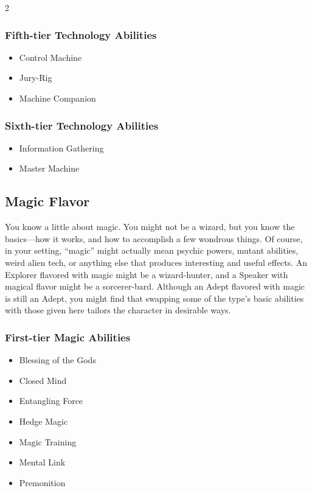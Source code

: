\begin{multicols}{2}
\subsubsection{Fifth-tier Technology Abilities}

\begin{itemize}
\item Control Machine
\item Jury-Rig
\item Machine Companion
\end{itemize}
 
\subsubsection{Sixth-tier Technology Abilities}

\begin{itemize}
\item Information Gathering
\item Master Machine
\end{itemize}

\subsection{Magic Flavor}

You know a little about magic. You might not be a wizard, but you know the basics—how it works, and how to accomplish a few wondrous things. Of course, in your setting, “magic” might actually mean psychic powers, mutant abilities, weird alien tech, or anything else that produces interesting and useful effects. 
An Explorer flavored with magic might be a wizard-hunter, and a Speaker with magical flavor might be a sorcerer-bard. Although an Adept flavored with magic is still an Adept, you might find that swapping some of the type’s basic abilities with those given here tailors the character in desirable ways.

\subsubsection{First-tier Magic Abilities}

\begin{itemize} 
\item Blessing of the Gods
\item Closed Mind
\item Entangling Force
\item Hedge Magic
\item Magic Training
\item Mental Link
\item Premonition
\end{itemize}


\end{multicols}
